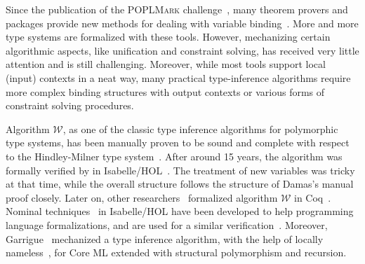 Since the publication of the \textsc{POPLMark} challenge~\citep{aydemir2005mechanized},
many theorem provers and packages provide new methods for dealing
with variable binding~\citep{aydemir2008engineering,urban2008nominalTech,chlipala2008parametric}.
More and more type systems are formalized with these tools.
However, mechanizing certain algorithmic aspects, like unification and
constraint solving, has received very little attention and is still challenging.
Moreover, while most tools support local (input) contexts in a neat way,
many practical type-inference algorithms require
more complex binding structures with output contexts or various forms of constraint solving procedures.

Algorithm $\mathcal{W}$,
as one of the classic type inference algorithms for polymorphic type systems,
has been manually proven to be sound and complete
with respect to the Hindley-Milner type system~\citep{hindley1969principal,milner1978theory,damas1982principal}.
After around 15 years, the algorithm was formally verified by
\citet{naraschewski1999type} in Isabelle/HOL~\citep{nipkow2002isabelle}.
The treatment of new variables was tricky at that time, while the overall structure follows the
structure of Damas's manual proof closely.
Later on, other researchers~\citep{dubois2000proving,dubois1999certification}
formalized algorithm $\mathcal{W}$ in Coq~\citep{Coq}.
Nominal techniques~\citep{urban2008nominalTech} in Isabelle/HOL have been
developed to help programming language formalizations, and are used for a similar
verification~\citep{urban2008nominal}. Moreover, Garrigue~\citep{garrigue2015certified}
mechanized a type inference algorithm,
with the help of locally nameless~\citep{LocallyNameless},
for Core ML extended with structural polymorphism and recursion.

